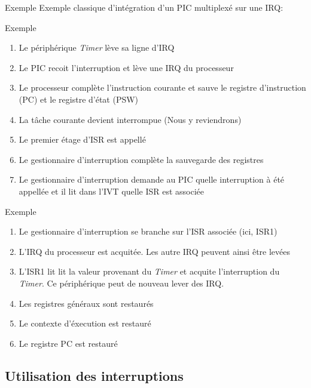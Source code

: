 \begin{frame}{Exemple}
  Exemple classique d'intégration d'un PIC multiplexé sur une IRQ:
  \begin{center}
  \end{center}
\end{frame} 

\begin{frame}{Exemple}
  \begin{enumerate}
  \item Le périphérique \emph{Timer} lève sa ligne d'IRQ
  \item Le PIC recoit l'interruption et lève une IRQ du processeur
  \item  Le processeur  complète  l'instruction courante  et sauve  le
    registre d'instruction (PC) et le registre d'état (PSW)
  \item La tâche courante devient interrompue (Nous y reviendrons)
  \item Le premier étage d'ISR est appellé
  \item  Le  gestionnaire d'interruption  complète  la sauvegarde  des
    registres
  \item   Le  gestionnaire  d'interruption   demande  au   PIC  quelle
    interruption à  été appellée et il  lit dans l'IVT  quelle ISR est
    associée
  \end{enumerate}
\end{frame}

\begin{frame}{Exemple}
  \begin{enumerate}
  \item Le  gestionnaire d'interruption se branche  sur l'ISR associée
    (ici, ISR1)
  \item L'IRQ du processeur est  acquitée. Les autre IRQ peuvent ainsi
    être levées
  \item L'ISR1 lit lit la  valeur provenant du \emph{Timer} et acquite
    l'interruption  du \emph{Timer}. Ce  périphérique peut  de nouveau
    lever des IRQ.
  \item Les registres généraux sont restaurés
  \item Le contexte d'éxecution est restauré
  \item Le registre PC est restauré
  \end{enumerate}
\end{frame} 

\subsection{Utilisation des interruptions}

